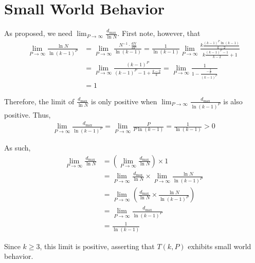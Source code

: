 \section{Small World Behavior}

    As proposed, we need $\lim_{P \to \infty} \frac{d_{\max}}{\ln N}$. First note, however, that
    \begin{align*}
        \lim_{P \to \infty} \frac{\ln N}{\ln (k-1)^P}
        &= \lim_{P \to \infty} \frac{N^{-1} \cdot \frac{d N}{dP}}{\ln(k-1)}
        = \frac{1}{\ln(k-1)} \lim_{P \to \infty} \frac{k \frac{(k-1)^P \ln(k-1)}{k-2}}{k \frac{(k-1)^P - 1}{k - 2} + 1} \\
        &= \lim_{P \to \infty} \frac{(k-1)^P}{(k-1)^P - 1 + \frac{k-2}{k}}
        = \lim_{P \to \infty} \frac{1}{1 - \frac{-\frac{2}{k}}{(k-1)^P}} \\
        &= 1
    \end{align*}

    Therefore, the limit of $\frac{d_{\max}}{\ln N}$ is only positive when $\lim_{P \to \infty} \frac{d_{\max}}{\ln(k-1)^P}$ is also positive. Thus,
    \begin{align*}
        \lim_{P \to \infty} \frac{d_{\max}}{\ln(k-1)^P} =  \lim_{P \to \infty} \frac{P}{P \ln(k-1)} = \frac{1}{\ln(k-1)} > 0
    \end{align*}

    As such,
    \begin{align*}
        \lim_{P \to \infty} \frac{d_{\max}}{\ln N}
        &= \left(\lim_{P \to \infty} \frac{d_{\max}}{\ln N}\right) \times 1 \\
        &= \lim_{P \to \infty} \frac{d_{\max}}{\ln N} \times \lim_{P \to \infty} \frac{\ln N}{\ln (k-1)^P} \\
        &= \lim_{P \to \infty} \left(\frac{d_{\max}}{\ln N} \times \frac{\ln N}{\ln (k-1)^P}\right) \\
        &= \lim_{P \to \infty} \frac{d_{\max}}{\ln(k-1)^P} \\
        &= \frac{1}{\ln(k-1)}
    \end{align*}

    Since $k \geq 3$, this limit is positive, asserting that $T(k,P)$ exhibits small world behavior.
